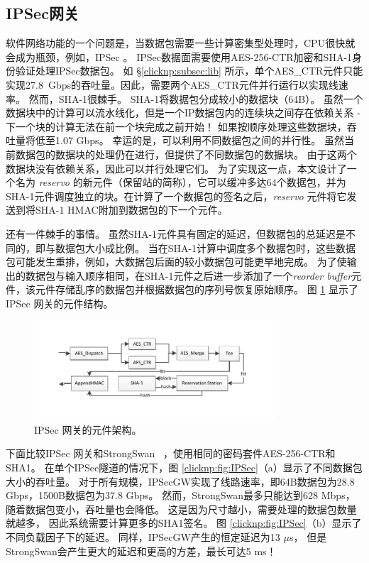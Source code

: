 \subsection{IPSec网关}
\label{clicknp:subsec:ipsec}

软件网络功能的一个问题是，当数据包需要一些计算密集型处理时，CPU很快就会成为瓶颈，例如，IPSec \cite {packetshader}。
IPSec数据面需要使用AES-256-CTR加密和SHA-1身份验证处理IPSec数据包。
如 \S \ref {clicknp:subsec:lib} 所示，单个AES\_CTR元件只能实现27.8~Gbps的吞吐量。因此，需要两个AES\_CTR元件并行运行以实现线速率。
然而，SHA-1很棘手。 SHA-1将数据包分成较小的数据块（64B）。
虽然一个数据块中的计算可以流水线化，但是一个IP数据包内的连续块之间存在依赖关系 - 下一个块的计算无法在前一个块完成之前开始！
如果按顺序处理这些数据块，吞吐量将低至1.07 Gbps。
幸运的是，可以利用不同数据包之间的并行性。
虽然当前数据包的数据块的处理仍在进行，但提供了不同数据包的数据块。
由于这两个数据块没有依赖关系，因此可以并行处理它们。
为了实现这一点，本文设计了一个名为 \textit {reservo} 的新元件（保留站的简称），它可以缓冲多达64个数据包，并为SHA-1元件调度独立的块。在计算了一个数据包的签名之后，\textit {reservo} 元件将它发送到将SHA-1 HMAC附加到数据包的下一个元件。

还有一件棘手的事情。
虽然SHA-1元件具有固定的延迟，但数据包的总延迟是不同的，即与数据包大小成比例。
当在SHA-1计算中调度多个数据包时，这些数据包可能发生重排，例如，大数据包后面的较小数据包可能更早地完成。
为了使输出的数据包与输入顺序相同，在SHA-1元件之后进一步添加了一个\textit {reorder buffer}元件，该元件存储乱序的数据包并根据数据包的序列号恢复原始顺序。
图 \ref{clicknp:fig:IPSec-arch} 显示了 IPSec 网关的元件结构。


\begin{figure}[htbp]
	\centering
	\includegraphics[width=0.8\textwidth]{image/IPSec}
	\caption{IPSec 网关的元件架构。}
	\label{clicknp:fig:IPSec-arch}
\end{figure}


下面比较IPSec 网关和StrongSwan~ \cite {strongswan}，使用相同的密码套件AES-256-CTR和SHA1。
在单个IPSec隧道的情况下，图 \ref {clicknp:fig:IPSec}（a）显示了不同数据包大小的吞吐量。
对于所有规模，IPSecGW实现了线路速率，即64B数据包为28.8 Gbps，1500B数据包为37.8 Gbps。
然而，StrongSwan最多只能达到628 Mbps，随着数据包变小，吞吐量也会降低。
这是因为尺寸越小，需要处理的数据包数量就越多，
因此系统需要计算更多的SHA1签名。
图 \ref {clicknp:fig:IPSec}（b）显示了不同负载因子下的延迟。 同样，IPSecGW产生的恒定延迟为13 $\mu$s，
但是StrongSwan会产生更大的延迟和更高的方差，最长可达5 ms！



